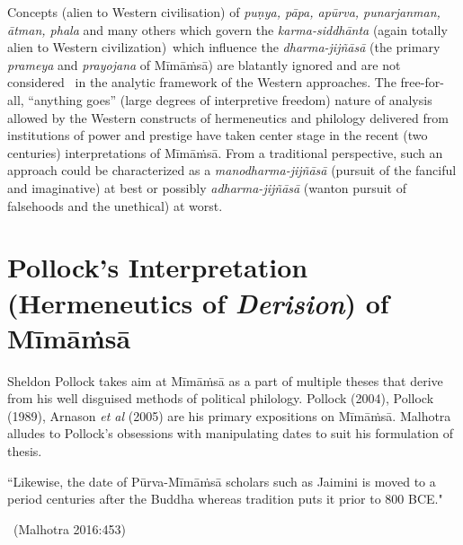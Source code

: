 Concepts (alien to Western civilisation) of \textit{puṇya, pāpa, apūrva, punarjanman, ātman, phala} and many others which govern the \textit{karma-siddhānta} (again totally alien to Western civilization) which influence the \textit{dharma-jijñāsā} (the primary \textit{prameya} and \textit{prayojana} of Mīmāṁsā) are blatantly ignored and are not considered  in the analytic framework of the Western approaches. The free-for-all, “anything goes” (large degrees of interpretive freedom) nature of analysis allowed by the Western constructs of hermeneutics and philology delivered from institutions of power and prestige have taken center stage in the recent (two centuries) interpretations of Mīmāṁsā. From a traditional perspective, such an approach could be characterized as a \textit{manodharma-jijñāsā} (pursuit of the fanciful and imaginative) at best or possibly \textit{adharma-jijñāsā} (wanton pursuit of falsehoods and the unethical) at worst.


\section*{Pollock’s Interpretation (Hermeneutics of \textit{Derision}) of Mīmāṁsā}

Sheldon Pollock takes aim at Mīmāṁsā as a part of multiple theses that derive from his well disguised methods of political philology. Pollock (2004), Pollock (1989), Arnason \textit{et al} (2005) are his primary expositions on Mīmāṁsā. Malhotra alludes to Pollock’s obsessions with manipulating dates to suit his formulation of thesis.
\begin{myquote}
“Likewise, the date of Pūrva-Mīmāṁsā scholars such as Jaimini is moved to a period centuries after the Buddha whereas tradition puts it prior to 800 BCE."

~\hfill (Malhotra 2016:453)
\end{myquote}

\newpage

